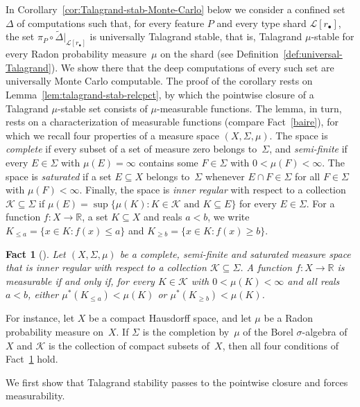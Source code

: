 \documentclass[psamsfonts]{amsart}
\newtheorem{fact}[thm]{Fact}
\theoremstyle{definition}
\theoremstyle{remark}
\numberwithin{equation}{section}
\begin{document}
In Corollary~\ref{cor:Talagrand-stab-Monte-Carlo} below we consider a confined set $\Delta$ of computations such that, for every feature $P$ and every type shard $\mathcal{L}[r_\bullet]$, the set $\pi_P\circ\tilde\Delta|_{\mathcal{L}[r_\bullet]}$ is universally Talagrand stable, that is, Talagrand $\mu$-stable for every Radon probability measure~$\mu$ on the shard (see Definition~\ref{def:universal-Talagrand}).
We show there that the deep computations of every such set are universally Monte Carlo computable.
The proof of the corollary rests on Lemma~\ref{lem:talagrand-stab-relcpct}, by which the pointwise closure of a Talagrand $\mu$-stable set consists of $\mu$-measurable functions.
The lemma, in turn, rests on a characterization of measurable functions (compare Fact~\ref{baire}), for which we recall four properties of a measure space $(X,\Sigma,\mu)$.
The space is \emph{complete} if every subset of a set of measure zero belongs to~$\Sigma$, and \emph{semi-finite} if every $E\in\Sigma$ with $\mu(E)=\infty$ contains some $F\in\Sigma$ with $0<\mu(F)<\infty$.
The space is \emph{saturated} if a set $E\subseteq X$ belongs to~$\Sigma$ whenever $E\cap F\in\Sigma$ for all $F\in\Sigma$ with $\mu(F)<\infty$.
Finally, the space is \emph{inner regular} with respect to a collection $\mathcal{K}\subseteq\Sigma$ if $\mu(E)=\sup\{\mu(K):K\in\mathcal{K} \text{ and } K\subseteq E\}$ for every $E\in\Sigma$.
For a function $f\colon X\to\mathbb{R}$, a set $K\subseteq X$ and reals $a<b$, we write $K_{\le a}=\{x\in K:f(x)\leq a\}$ and $K_{\ge b}=\{x\in K:f(x)\geq b\}$.

\begin{fact}[{\cite[Lemma~413G]{fremlin2003vol4}}]\label{fact:meas-fns-charn}
  Let $(X,\Sigma,\mu)$ be a complete, semi-finite and saturated measure space that is inner regular with respect to a collection $\mathcal{K}\subseteq\Sigma$.
  A function $f\colon X\to\mathbb{R}$ is measurable if and only if,
  for every $K\in\mathcal{K}$ with $0<\mu(K)<\infty$ and all reals $a<b$, either $\mu^*(K_{\le a})<\mu(K)$ or $\mu^*(K_{\ge b})<\mu(K)$.
\end{fact}

For instance, let $X$ be a compact Hausdorff space, and let $\mu$ be a Radon probability measure on~$X$.
If $\Sigma$ is the completion by~$\mu$ of the Borel $\sigma$-algebra of~$X$ and $\mathcal{K}$ is the collection of compact subsets of~$X$, then all four conditions of Fact~\ref{fact:meas-fns-charn} hold.

We first show that Talagrand stability passes to the pointwise closure and forces measurability.
\end{document}
